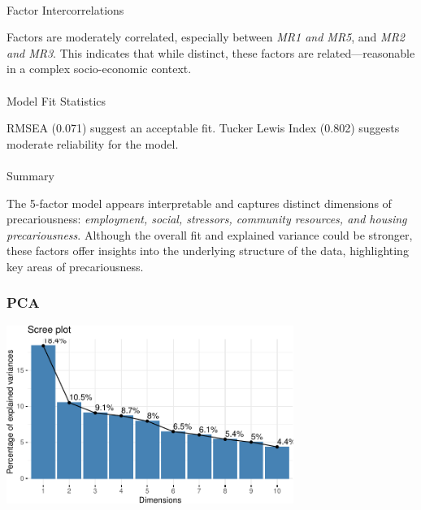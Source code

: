 \documentclass[
]{article}
\makeatletter
\let\oldparagraph\paragraph
\renewcommand{\paragraph}{
    \@ifstar
      \xxxParagraphStar
      \xxxParagraphNoStar
  }
\newcommand{\xxxParagraphStar}[1]{\oldparagraph*{#1}\mbox{}}
\newcommand{\xxxParagraphNoStar}[1]{\oldparagraph{#1}\mbox{}}
\makeatother
\begin{document}
\paragraph{Factor Intercorrelations}\label{factor-intercorrelations}

Factors are moderately correlated, especially between \emph{MR1 and
MR5}, and \emph{MR2 and MR3}. This indicates that while distinct, these
factors are related---reasonable in a complex socio-economic context.

\paragraph{Model Fit Statistics}\label{model-fit-statistics}

RMSEA (0.071) suggest an acceptable fit. Tucker Lewis Index (0.802)
suggests moderate reliability for the model.

\paragraph{Summary}\label{summary}

The 5-factor model appears interpretable and captures distinct
dimensions of precariousness: \emph{employment, social, stressors,
community resources, and housing precariousness}. Although the overall
fit and explained variance could be stronger, these factors offer
insights into the underlying structure of the data, highlighting key
areas of precariousness.

\subsubsection{PCA}\label{pca}

\begin{center}
\includegraphics[width=0.7\textwidth,height=\textheight]{draft_v2_files/figure-pdf/unnamed-chunk-15-1.pdf}
\end{center}
\end{document}
